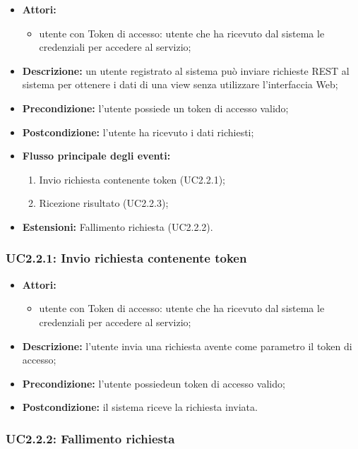\begin{itemize}
	\item \textbf{Attori:}
	\begin{itemize}
		\item utente con Token di accesso: utente che ha ricevuto dal sistema le credenziali per accedere al servizio;
	\end{itemize}
	\item \textbf{Descrizione:} un utente registrato al sistema può inviare richieste REST al sistema per ottenere i dati di una view senza utilizzare l'interfaccia Web;
	\item \textbf{Precondizione:} l'utente possiede un token di accesso valido;
	\item \textbf{Postcondizione:} l'utente ha ricevuto i dati richiesti;
	\item \textbf{Flusso principale degli eventi:}
	\begin{enumerate}
		\item Invio richiesta contenente token (UC2.2.1);
		\item Ricezione risultato (UC2.2.3);
	\end{enumerate}
	\item \textbf{Estensioni:} Fallimento richiesta (UC2.2.2).
\end{itemize}


\subsubsection{UC2.2.1: Invio richiesta contenente token}

\begin{itemize}
	\item \textbf{Attori:}
	\begin{itemize}
		\item utente con Token di accesso: utente che ha ricevuto dal sistema le credenziali per accedere al servizio;
	\end{itemize}
	\item \textbf{Descrizione:} l'utente invia una richiesta avente come parametro il token di accesso;
	\item \textbf{Precondizione:} l'utente possiedeun token di accesso valido;
	\item \textbf{Postcondizione:} il sistema riceve la richiesta inviata.
\end{itemize}

\subsubsection{UC2.2.2: Fallimento richiesta}

